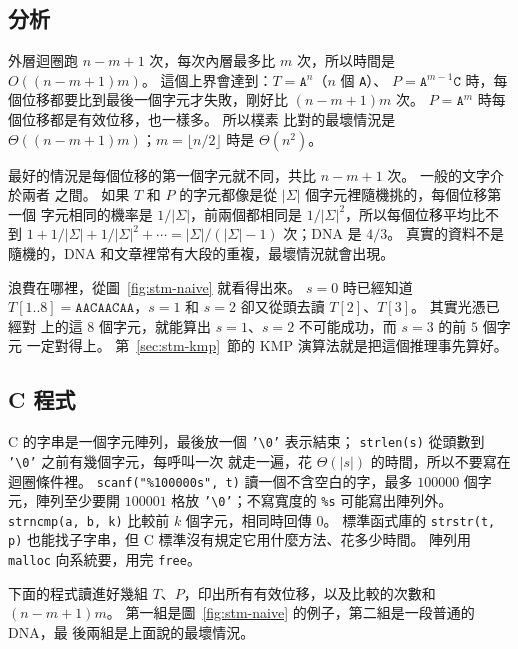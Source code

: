 \subsection{分析}

外層迴圈跑 $n - m + 1$ 次，每次內層最多比 $m$ 次，所以時間是
$O((n - m + 1)m)$。 這個上界會達到：$T = \mathtt{A}^n$（$n$ 個 \texttt{A}）、
$P = \mathtt{A}^{m-1}\mathtt{C}$ 時，每個位移都要比到最後一個字元才失敗，剛好比
$(n - m + 1)m$ 次。 $P = \mathtt{A}^m$ 時每個位移都是有效位移，也一樣多。 所以樸素
比對的最壞情況是 $\Theta((n - m + 1)m)$；$m = \lfloor n/2 \rfloor$ 時是
$\Theta(n^2)$。

最好的情況是每個位移的第一個字元就不同，共比 $n - m + 1$ 次。 一般的文字介於兩者
之間。 如果 $T$ 和 $P$ 的字元都像是從 $|\Sigma|$ 個字元裡隨機挑的，每個位移第一個
字元相同的機率是 $1/|\Sigma|$，前兩個都相同是 $1/|\Sigma|^2$，所以每個位移平均比不
到 $1 + 1/|\Sigma| + 1/|\Sigma|^2 + \cdots = |\Sigma| / (|\Sigma| - 1)$ 次；DNA 是
$4/3$。 真實的資料不是隨機的，DNA 和文章裡常有大段的重複，最壞情況就會出現。

浪費在哪裡，從圖~\ref{fig:stm-naive} 就看得出來。 $s = 0$ 時已經知道 $T[1..8] =
\mathtt{AACAACAA}$，$s = 1$ 和 $s = 2$ 卻又從頭去讀 $T[2]$、$T[3]$。 其實光憑已經對
上的這 $8$ 個字元，就能算出 $s = 1$、$s = 2$ 不可能成功，而 $s = 3$ 的前 $5$ 個字元
一定對得上。 第~\ref{sec:stm-kmp}~節的 KMP 演算法就是把這個推理事先算好。

\subsection{C 程式}

\begin{cbookrecap}[第~11~章 11.1--11.3、11.5 節，第~19~章 19.3 節]
C 的字串是一個字元陣列，最後放一個 \texttt{'\textbackslash 0'} 表示結束；
\texttt{strlen(s)} 從頭數到 \texttt{'\textbackslash 0'} 之前有幾個字元，每呼叫一次
就走一遍，花 $\Theta(|s|)$ 的時間，所以不要寫在迴圈條件裡。 \texttt{scanf("\%100000s",
t)} 讀一個不含空白的字，最多 $100000$ 個字元，陣列至少要開 $100001$ 格放
\texttt{'\textbackslash 0'}；不寫寬度的 \texttt{\%s} 可能寫出陣列外。
\texttt{strncmp(a, b, k)} 比較前 $k$ 個字元，相同時回傳 $0$。 標準函式庫的
\texttt{strstr(t, p)} 也能找子字串，但 C 標準沒有規定它用什麼方法、花多少時間。
陣列用 \texttt{malloc} 向系統要，用完 \texttt{free}。
\end{cbookrecap}

下面的程式讀進好幾組 $T$、$P$，印出所有有效位移，以及比較的次數和
$(n - m + 1)m$。 第一組是圖~\ref{fig:stm-naive} 的例子，第二組是一段普通的 DNA，最
後兩組是上面說的最壞情況。

